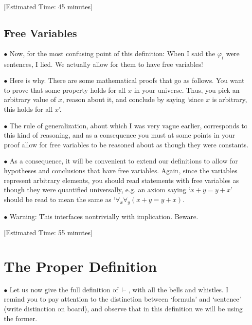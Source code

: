 \documentclass{article}
\newcommand\point[1]{\noindent \hspace{\labelsep} $\bullet$ #1 \smallskip}
\newcommand\timestamp[1]{\noindent \hspace{\labelsep} [Estimated Time: #1] \smallskip}
\begin{document}
\timestamp{45 minutes}

\subsection{Free Variables}

\point{Now, for the most confusing point of this definition: When I said the $\varphi_i$ were sentences, I lied. We actually allow for them to have free variables!}

\point{Here is why. There are some mathematical proofs that go as follows. You want to prove that some property holds for all $x$ in your universe. Thus, you pick an arbitrary value of $x$, reason about it, and conclude by saying `since $x$ is arbitrary, this holds for all $x$'.}

\point{The rule of generalization, about which I was very vague earlier, corresponds to this kind of reasoning, and as a consequence you must at some points in your proof allow for free variables to be reasoned about as though they were constants.}

\point{As a consequence, it will be convenient to extend our definitions to allow for hypotheses and conclusions that have free variables. Again, since the variables represent arbitrary elements, you should read statements with free variables as though they were quantified universally, e.g. an axiom saying `$x+y = y+x$' should be read to mean the same as `$\forall_x \forall_y (x+y = y+x)$.}

\point{Warning: This interfaces nontrivially with implication. Beware.}

\timestamp{55 minutes}

\section{The Proper Definition}

\point{Let us now give the full definition of $\vdash$, with all the bells and whistles. I remind you to pay attention to the distinction between `formula' and `sentence' (write distinction on board), and observe that in this definition we will be using the former.}
\end{document}
